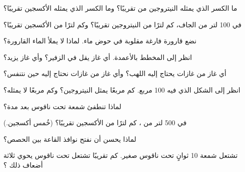 \begin{exercise}[$\star$]\label{exo:g4:air-a-mixture-of-gases:2}
ما الكسر الذي يمثله النيتروجين من  تقريبًا؟ وما الكسر الذي يمثله
الأكسجين تقريبًا؟
\end{exercise}

\begin{exercise}[$\star$]\label{exo:g4:air-a-mixture-of-gases:3}
في 100 لتر من  الجاف، كم لترًا من النيتروجين تقريبًا؟ وكم لترًا من
الأكسجين تقريبًا؟
\end{exercise}

\begin{exercise}[$\star$]\label{exo:g4:air-a-mixture-of-gases:4}
نضع قارورة فارغة مقلوبة في حوض ماء. لماذا لا يملأ الماء
القارورة؟
\end{exercise}

\begin{exercise}[$\star$]\label{exo:g4:air-a-mixture-of-gases:5}
انظر إلى المخطط بالأعمدة. أي غاز يقل في  الزفير؟ وأي غاز
يزيد؟
\end{exercise}

\begin{exercise}[$\star$]\label{exo:g4:air-a-mixture-of-gases:6}
أي غاز من غازات  يحتاج إليه اللهب؟ وأي غاز من غازات  نحتاج
إليه حين نتنفس؟
\end{exercise}

\begin{exercise}[$\star$]\label{exo:g4:air-a-mixture-of-gases:7}
انظر إلى الشكل الذي فيه 100 مربع. كم مربعًا يمثل النيتروجين؟ وكم مربعًا
لا يمثله؟
\end{exercise}

\begin{exercise}[$\star$]\label{exo:g4:air-a-mixture-of-gases:8}
لماذا تنطفئ شمعة تحت ناقوس بعد مدة؟
\end{exercise}

\begin{exercise}[$\star$]\label{exo:g4:air-a-mixture-of-gases:9}
في 500 لتر من ، كم لترًا من الأكسجين تقريبًا؟ (خُمس 
أكسجين.)
\end{exercise}

\begin{exercise}[$\star\star$]\label{exo:g4:air-a-mixture-of-gases:10}
لماذا يحسن أن نفتح نوافذ القاعة بين
الحصص؟
\end{exercise}

\begin{exercise}[$\star\star$]\label{exo:g4:air-a-mixture-of-gases:11}
تشتعل شمعة 10 ثوانٍ تحت ناقوس صغير. كم تقريبًا تشتعل تحت ناقوس يحوي
ثلاثة أضعاف ذلك ؟
\end{exercise}
